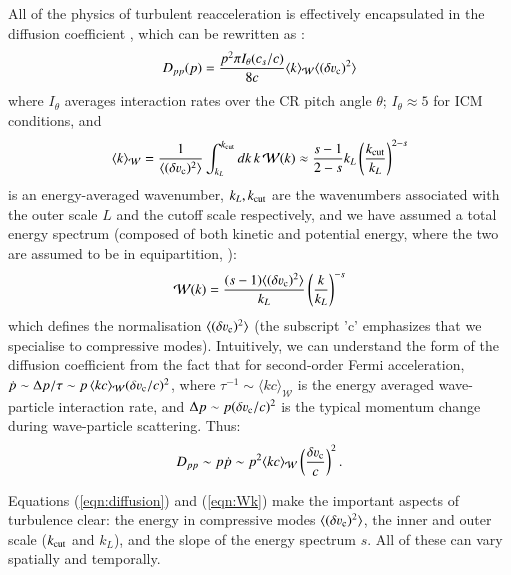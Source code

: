 \documentclass[fleqn,usenatbib,useAMS]{mnras}
\begin{document}
All of the physics of turbulent reacceleration is effectively encapsulated in the diffusion coefficient \citep{brunetti07}, which can be rewritten as \citep{miniati15}:
\begin{equation}
D_{pp}(p) = \frac{ p^{2} \upi I_{\theta}(c_{s}/c)}{8 c} \langle k \rangle_{\mathcal{W}} \langle (\delta \varv_{\rm c})^{2} \rangle
\label{eqn:diffusion}
\end{equation}
where $I_{\theta}$ averages interaction rates over the CR pitch angle $\theta$; $I_{\theta} \approx 5$ for ICM conditions, and
\begin{equation}
\langle k \rangle_{\mathcal{W}} = \frac{1}{\langle (\delta \varv_{\rm c})^{2} \rangle} \int_{k_L}^{k_{\rm cut}} d k \, k \, \mathcal{W}(k) \approx \frac{s-1}{2-s} k_L \left( \frac{k_{\rm cut}}{k_L} \right)^{2-s} 
\label{eqn:k_W} 
\end{equation}
is an energy-averaged wavenumber, $k_L, k_{\rm cut}$ are the wavenumbers associated with the outer scale $L$ and the cutoff scale respectively, and we have assumed a total energy spectrum (composed of both kinetic and potential energy, where the two are assumed to be in equipartition, \citealt{sarkar11}): 
\begin{equation}
\mathcal{W}(k) = \frac{(s-1) \langle (\delta \varv_{\rm c})^{2} \rangle}{k_L} \left( \frac{k}{k_L} \right)^{-s} 
\label{eqn:Wk}
\end{equation}
which defines the normalisation $\langle (\delta \varv_{\rm c})^{2} \rangle$ (the subscript 'c' emphasizes that we specialise to compressive modes). Intuitively, we can understand the form of the diffusion coefficient from the fact that for second-order Fermi acceleration, $\dot{p} \sim \Delta p/\tau \sim p\,\langle k c \rangle_{\mathcal{W}} (\delta \varv_{\rm c}/c)^{2}$, where $\tau^{-1} \sim \langle k c \rangle_{\mathcal{W}}$ is the energy averaged wave-particle interaction rate, and $\Delta p \sim p (\delta \varv_{\rm c}/c)^{2}$ is the typical momentum change during wave-particle scattering. Thus: 
\begin{equation}
  \label{eqn:Dpp}
D_{pp} \sim p \dot{p} \sim p^{2} \langle k c \rangle_{\mathcal{W}} \left( \frac{\delta \varv_{\rm c}}{c} \right)^{2}. 
\end{equation}

Equations (\ref{eqn:diffusion}) and (\ref{eqn:Wk}) make the important aspects of turbulence clear: the energy in compressive modes $\langle (\delta \varv_{\rm c})^{2} \rangle$, the inner and outer scale ($k_{\rm cut}$ and $k_L$), and the slope of the energy spectrum $s$. All of these can vary spatially and temporally. 
\end{document}
